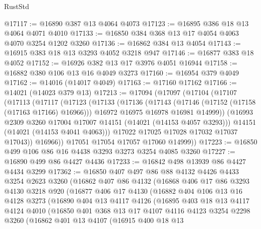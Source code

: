 \begin{lexlean}{RustStd}
\begin{coremodule}
@17117 := @16890 @387 @13 @4064 @4073
@17123 := @16895 @386 @18 @13 @4064 @4071 @4010
@17133 := @16850 @384 @368 @13 @17 @4054 @4063 @4070 @3254 @1202 @3260
@17136 := @16862 @384 @13 @4054
@17143 := @16915 @383 @18 @13 @3293 @4052 @3218 @947
@17146 := @16877 @383 @18 @4052
@17152 := @16926 @382 @13 @17 @3976 @4051 @16944
@17158 := @16882 @380 @106 @13 @16 @4049 @3273
@17160 := @16954 @379 @4049
@17162 := @14016 (@14017 @4049)
@17163 := @17160 @17162
@17166 := @14021 (@14023 @379 @13)
@17213 := @17094
    (@17097
      (@17104
        (@17107
          (@17113
            (@17117
              (@17123
                (@17133
                  (@17136
                    (@17143
                      (@17146 (@17152 (@17158 (@17163 @17166) @16966)))
                      @16972
                      @16975
                      @16978
                      @16981
                      @14999))
                  (@16993 @2309 @3260 @17004 @17007 @14151 (@14021 (@14153 @4057 @3293)))
                  @14151
                  (@14021 (@14153 @4041 @4063)))
                @17022
                @17025
                @17028
                @17032
                @17037
                @17043))
            @16966))
        @17051
        @17054
        @17057
        @17060
        @14999))
@17223 := @16850 @499 @106 @86 @16 @4438 @3293 @3273 @3254 @4085 @3260
@17227 := @16890 @499 @86 @4427 @4436
@17233 := @16842 @498 @13939 @86 @4427 @4434 @3299
@17362 := @16850
    @407
    @497
    @86
    @88
    @4132
    @4426
    @4433
    @3254
    @2623
    @3260
    (@16862
      @407
      @86
      @4132
      (@16868
        @406
        @17
        @86
        @3293
        @4130
        @3218
        @920
        (@16877
          @406
          @17
          @4130
          (@16882
            @404
            @106
            @13
            @16
            @4128
            @3273
            (@16890
              @404
              @13
              @4117
              @4126
              (@16895
                @403
                @18
                @13
                @4117
                @4124
                @4010
                (@16850
                  @401
                  @368
                  @13
                  @17
                  @4107
                  @4116
                  @4123
                  @3254
                  @2298
                  @3260
                  (@16862
                    @401
                    @13
                    @4107
                    (@16915
                      @400
                      @18
                      @13

\end{coremodule}
\end{lexlean}

